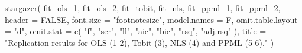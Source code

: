 \documentclass[12pt]{article}
\newenvironment{Shaded}{\begin{snugshade}}{\end{snugshade}}
\newcommand{\AttributeTok}[1]{\textcolor[rgb]{0.40,0.45,0.13}{#1}}
\newcommand{\ConstantTok}[1]{\textcolor[rgb]{0.56,0.35,0.01}{#1}}
\newcommand{\FunctionTok}[1]{\textcolor[rgb]{0.28,0.35,0.67}{#1}}
\newcommand{\NormalTok}[1]{\textcolor[rgb]{0.00,0.23,0.31}{#1}}
\newcommand{\StringTok}[1]{\textcolor[rgb]{0.13,0.47,0.30}{#1}}
\begin{document}
\begin{Shaded}
\begin{Highlighting}[]
\FunctionTok{stargazer}\NormalTok{(}
\NormalTok{  fit\_ols\_1, fit\_ols\_2, fit\_tobit, fit\_nls, fit\_ppml\_1, fit\_ppml\_2,}
  \AttributeTok{header =} \ConstantTok{FALSE}\NormalTok{, }\AttributeTok{font.size =} \StringTok{"footnotesize"}\NormalTok{, }\AttributeTok{model.names =}\NormalTok{ F,}
  \AttributeTok{omit.table.layout =} \StringTok{"d"}\NormalTok{, }\AttributeTok{omit.stat =} \FunctionTok{c}\NormalTok{(}
    \StringTok{"f"}\NormalTok{, }\StringTok{"ser"}\NormalTok{, }\StringTok{"ll"}\NormalTok{, }\StringTok{"aic"}\NormalTok{, }\StringTok{"bic"}\NormalTok{, }\StringTok{"rsq"}\NormalTok{, }\StringTok{"adj.rsq"}
\NormalTok{  ),}
  \AttributeTok{title =} \StringTok{"Replication results for OLS (1{-}2), Tobit (3), NLS (4) and}
\StringTok{  PPML (5{-}6)."}
\NormalTok{)}
\end{Highlighting}
\end{Shaded}
\end{document}
